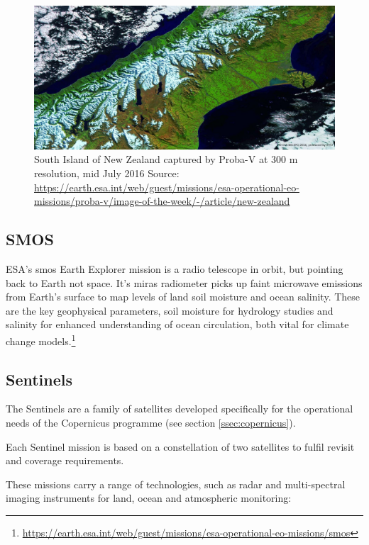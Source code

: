 \documentclass{article}
\begin{document}
\begin{figure}[h!]    
\centering
\includegraphics[width=\linewidth]{figures/New-Zealand_probaV.png}
\caption{South Island of New Zealand captured by Proba-V at 300 m resolution, mid July 2016
Source: \url{https://earth.esa.int/web/guest/missions/esa-operational-eo-missions/proba-v/image-of-the-week/-/article/new-zealand}}
\label{fig:nz_probaV}
\end{figure}

\subsection{SMOS}

ESA's \ac{smos} Earth Explorer mission is a radio telescope in orbit, but pointing back to Earth not space. It's \ac{miras} radiometer picks up faint microwave emissions from Earth's surface to map levels of land soil moisture and ocean salinity. These are the key geophysical parameters, soil moisture for hydrology studies and salinity for enhanced understanding of ocean circulation, both vital for climate change models.\footnote{\url{https://earth.esa.int/web/guest/missions/esa-operational-eo-missions/smos}}


\subsection{Sentinels}
\label{ssec:sentinels}

The Sentinels are a family of satellites developed specifically for the operational needs of the Copernicus programme (see section \ref{ssec:copernicus}). 

Each Sentinel mission is based on a constellation of two satellites to fulfil revisit and coverage requirements. 

These missions carry a range of technologies, such as radar and multi-spectral imaging instruments for land, ocean and atmospheric monitoring:
\end{document}
